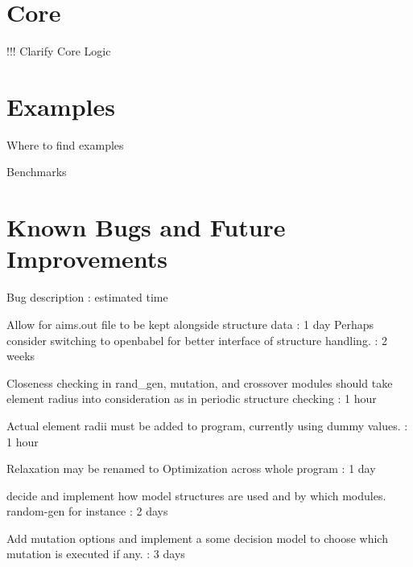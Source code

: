\section{Core}
	!!! Clarify Core Logic


\section{Examples}

	Where to find examples

	Benchmarks

\section{Known Bugs and Future Improvements}

	Bug description
		: estimated time
		
	Allow for aims.out file to be kept alongside structure data
		: 1 day
	Perhaps consider switching to openbabel for better interface of structure handling.
		: 2 weeks
		
	Closeness checking in rand\_gen, mutation, and crossover modules should take element radius into consideration as in periodic structure checking
		: 1 hour
		
	Actual element radii must be added to program, currently using dummy values.
		: 1 hour
		
	Relaxation may be renamed to Optimization across whole program
		: 1 day
		
	decide and implement how model structures are used and by which modules. random-gen for instance
		: 2 days
		
	Add mutation options and implement a some decision model to choose which mutation is executed if any.
		: 3 days
